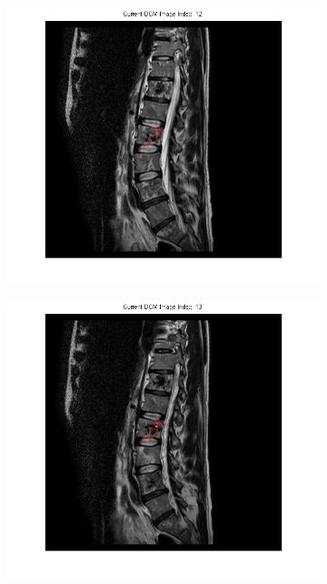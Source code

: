 \documentclass{article}
\begin{document}
{\begin{figure}[h]
\begin{subfigure}[t]{0.15\linewidth}
      \end{subfigure}
      \hfill\begin{subfigure}[t]{0.15\linewidth}
        \centering
        \includegraphics[width=\linewidth,trim={6cm 3cm 6cm 0},clip]{imgs/mask12}
      \end{subfigure}
      \hfill\begin{subfigure}[t]{0.15\linewidth}
        \centering
        \includegraphics[width=\linewidth,trim={6cm 3cm 6cm 0},clip]{imgs/mask13}

\end{subfigure}
\end{figure}}
\end{document}
